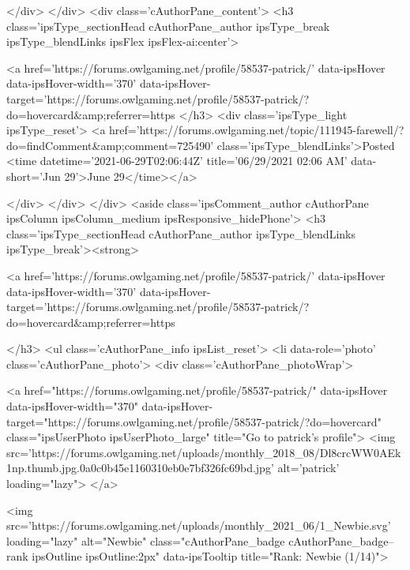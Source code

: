 			</div>
		</div>
		<div class='cAuthorPane_content'>
			<h3 class='ipsType_sectionHead cAuthorPane_author ipsType_break ipsType_blendLinks ipsFlex ipsFlex-ai:center'>
				


<a href='https://forums.owlgaming.net/profile/58537-patrick/' data-ipsHover data-ipsHover-width='370' data-ipsHover-target='https://forums.owlgaming.net/profile/58537-patrick/?do=hovercard&amp;referrer=https%
			</h3>
			<div class='ipsType_light ipsType_reset'>
				<a href='https://forums.owlgaming.net/topic/111945-farewell/?do=findComment&amp;comment=725490' class='ipsType_blendLinks'>Posted <time datetime='2021-06-29T02:06:44Z' title='06/29/2021 02:06  AM' data-short='Jun 29'>June 29</time></a>
				
			</div>
		</div>
	</div>
	<aside class='ipsComment_author cAuthorPane ipsColumn ipsColumn_medium ipsResponsive_hidePhone'>
		<h3 class='ipsType_sectionHead cAuthorPane_author ipsType_blendLinks ipsType_break'><strong>


<a href='https://forums.owlgaming.net/profile/58537-patrick/' data-ipsHover data-ipsHover-width='370' data-ipsHover-target='https://forums.owlgaming.net/profile/58537-patrick/?do=hovercard&amp;referrer=https%
			
		</h3>
		<ul class='cAuthorPane_info ipsList_reset'>
			<li data-role='photo' class='cAuthorPane_photo'>
				<div class='cAuthorPane_photoWrap'>
					


	<a href="https://forums.owlgaming.net/profile/58537-patrick/" data-ipsHover data-ipsHover-width="370" data-ipsHover-target="https://forums.owlgaming.net/profile/58537-patrick/?do=hovercard" class="ipsUserPhoto ipsUserPhoto_large" title="Go to patrick's profile">
		<img src='https://forums.owlgaming.net/uploads/monthly_2018_08/Dl8crcWW0AEk1np.thumb.jpg.0a0c0b45e1160310eb0e7bf326fc69bd.jpg' alt='patrick' loading="lazy">
	</a>

					
					
						
<img src='https://forums.owlgaming.net/uploads/monthly_2021_06/1_Newbie.svg' loading="lazy" alt="Newbie" class="cAuthorPane_badge cAuthorPane_badge--rank ipsOutline ipsOutline:2px" data-ipsTooltip title="Rank: Newbie (1/14)">
					
